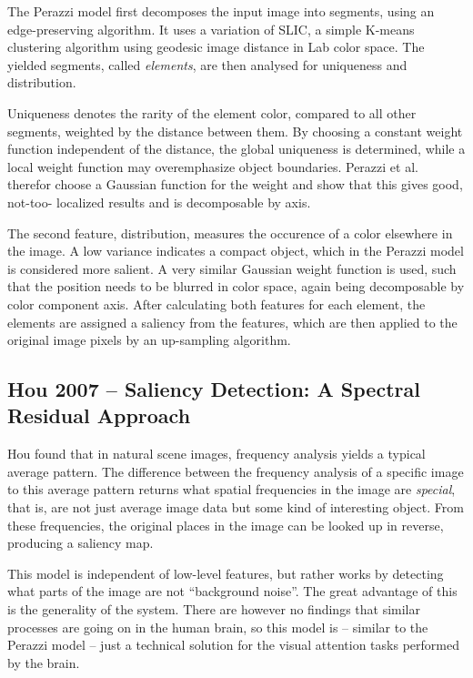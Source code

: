 \documentclass[a4paper,12pt,fleqn,oneside]{scrartcl}
\begin{document}
The Perazzi model first decomposes the input image into segments, using an edge-preserving algorithm. It uses a variation of
SLIC, a simple K-means clustering algorithm using geodesic image distance in Lab color space. The yielded segments,
called \emph{elements}, are then analysed for uniqueness and distribution.

Uniqueness denotes the rarity of the element color, compared to all other
segments, weighted by the distance between them. By choosing a constant weight
function independent of the distance, the global uniqueness is determined, while
a local weight function may overemphasize object boundaries. Perazzi et al. therefor choose
a Gaussian function for the weight and show that this gives good, not-too-
localized results and is decomposable by axis.

The second feature, distribution, measures the occurence of a color elsewhere in the image. A low variance indicates a
compact object, which in the Perazzi model is considered more salient. A very similar Gaussian weight function is used, such that the
position needs to be blurred in color space, again being decomposable by color component axis. After calculating both
features for each element, the elements are assigned a saliency from the features, which are then applied to the
original image pixels by an up-sampling algorithm.

\subsection{Hou 2007 -- Saliency Detection: A Spectral Residual Approach}

Hou found that in natural scene images, frequency analysis yields a typical average pattern. The difference between the
frequency analysis of a specific image to this average pattern returns what spatial frequencies in the image are \emph{special},
that is, are not just average image data but some kind of interesting object. From these frequencies, the original
places in the image can be looked up in reverse, producing a saliency map.

This model is independent of low-level features, but rather works by detecting what parts of the image are not ``background
noise''. The great advantage of this is the generality of the system. There are however no findings that similar processes are
going on in the human brain, so this model is -- similar to the Perazzi model -- just a technical solution for the visual
attention tasks performed by the brain.
\end{document}
